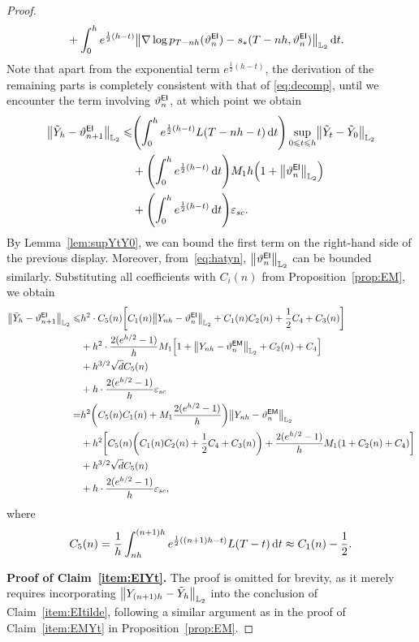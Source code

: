 \begin{proof}
\begin{align*}
    &+\int_0^he^{\frac{1}{2}(h-t)}\l|\nabla\log p_{T-nh}(\vartheta_n^{\sf EI})-s_*(T-nh,\vartheta_n^{\sf EI})\r|_{\Ltwo}\rmd t.
\end{align*}
Note that apart from the exponential term $e^{\frac{1}{2}(h-t)}$, the derivation of the remaining parts is completely consistent with that of \eqref{eq:decomp}, until we encounter the term involving $\vartheta_n^{\sf EI}$, at which point we obtain
\begin{align*}
    \l|\tilde{Y}_h-\vartheta_{n+1}^{\sf EI}\r|_{\Ltwo}\leqslant& \left(\int_0^he^{\frac{1}{2}(h-t)}L(T-nh-t)\rmd t\right)\sup_{0\leqslant t\leqslant h}\l|\tilde{Y}_t-\tilde{Y}_0\r|_{\Ltwo}\\
    &+ \left(\int_0^he^{\frac{1}{2}(h-t)}\rmd t\right)M_1h\Big(1+\l|\vartheta_n^{\sf EI}\r|_{\Ltwo}\Big)\\
    &+ \left(\int_0^he^{\frac{1}{2}(h-t)}\rmd t\right)\varepsilon_{sc}.
\end{align*}
By Lemma~\ref{lem:supYtY0}, we can bound the first term on the right-hand side of the previous display.
Moreover, from~\eqref{eq:hatyn}, $\l|\vartheta_n^{\sf EI}\r|_{\Ltwo}$ 
can be bounded similarly. Substituting all coefficients with $C_i(n)$ from Proposition~\ref{prop:EM}, we obtain
\begin{align*}
    \l|\tilde{Y}_h-\vartheta_{n+1}^{\sf EI}\r|_{\Ltwo}\leqslant & h^2\cdot C_5(n)\left[ C_1(n)\l|Y_{nh}-\vartheta_n^{\sf EI}\r|_{\Ltwo}+C_1(n)C_2(n)+\dfrac{1}{2}C_4+C_3(n)\right]\\
    &+h^2\cdot \dfrac{2(e^{h/2}-1)}{h}M_1\left[1+\l|Y_{nh}-\vartheta_n^{\sf EM}\r|_{\Ltwo}+C_2(n)+C_4\right]\\
    &+h^{3/2}\sqrt{d}C_5(n)\\
    &+h\cdot\dfrac{2(e^{h/2}-1)}{h}\varepsilon_{sc}\\
    =&h^2\left(C_5(n)C_1(n)+M_1\dfrac{2(e^{h/2}-1)}{h}\right)\l|Y_{nh}-\vartheta_n^{\sf EM}\r|_{\Ltwo}\\
    &+h^2\left[C_5(n)\left(C_1(n)C_2(n)+\dfrac{1}{2}C_4+C_3(n)\right)+\dfrac{2(e^{h/2}-1)}{h}M_1(1+C_2(n)+C_4)\right]\\
    &+h^{3/2}\sqrt{d}C_5(n)\\
    &+h\cdot\dfrac{2(e^{h/2}-1)}{h}\varepsilon_{sc},
\end{align*}
where
\begin{align*}
    C_5(n)=\dfrac{1}{h}\int_{nh}^{(n+1)h}e^{\frac{1}{2}((n+1)h-t)}L(T-t){\,\rm d} t\approx C_1(n)-\dfrac{1}{2}.
\end{align*} 

\noindent\textbf{Proof of Claim~\ref{item:EIYt}.} The proof is omitted for brevity, as it merely requires incorporating $\l|Y_{(n+1)h}-\tilde Y_h\r|_{\Ltwo}$ into the conclusion of Claim~\ref{item:EItilde}, following a similar argument as in the proof of Claim~\ref{item:EMYt} in Proposition~\ref{prop:EM}.

\end{proof}

